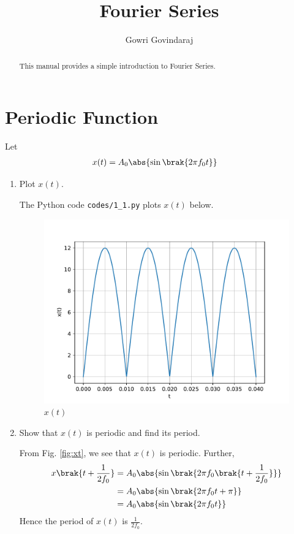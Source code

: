 \documentclass[journal,12pt,twocolumn]{IEEEtran}
\renewcommand\thesection{\arabic{section}}
\begin{document}
\vspace{3cm}
\title{Fourier Series}
\author{Gowri Govindaraj}
\maketitle
\tableofcontents
\renewcommand{\thefigure}{\theenumi}
\renewcommand{\thetable}{\theenumi}
\bigskip
\begin{abstract}
This manual provides a simple introduction to Fourier Series.
\end{abstract}
\section{Periodic Function}
Let 
\begin{align}
	x(t) &= A_0\abs{\sin\brak{2\pi f_0 t}}
	\label{eq:10-orig-diff-def}
\end{align}
\begin{enumerate}[label=\thesection.\arabic*
,ref=\thesection.\theenumi]
\item Plot $x(t)$.

\solution The Python code \texttt{codes/1\_1.py} plots $x(t)$ below.
\begin{figure}[!htp]
    \includegraphics[width=\columnwidth]{figs/1_1.pdf}
    \caption{$x(t)$}
    \label{fig:xt}
\end{figure}
\item Show that $x(t)$ is periodic and find its period.

\solution From Fig. \eqref{fig:xt}, we see that $x(t)$ is periodic. Further,
\begin{align}
    x\brak{t+\frac{1}{2f_0}} &= A_0\abs{\sin\brak{2\pi f_0\brak{t + \frac{1}{2f_0}}}} \\
                            &= A_0\abs{\sin\brak{2\pi f_0t + \pi}} \\
                            &= A_0\abs{\sin\brak{2\pi f_0t}}
\end{align}
Hence the period of $x(t)$ is $\frac{1}{2f_0}$.
\end{enumerate}
\end{document}
